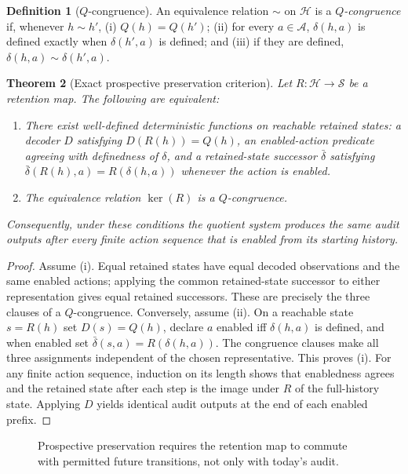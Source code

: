 \documentclass[11pt,letterpaper]{article}
\newtheorem{theorem}{Theorem}[section]
\theoremstyle{definition}
\newtheorem{definition}[theorem]{Definition}
\newcommand{\Hh}{\mathcal H}
\newcommand{\Act}{\mathcal A}
\newcommand{\State}{\mathcal S}
\begin{document}
\begin{definition}[$Q$-congruence]
An equivalence relation $\sim$ on $\Hh$ is a \emph{$Q$-congruence} if, whenever $h\sim h'$, (i) $Q(h)=Q(h')$; (ii) for every $a\in\Act$, $\delta(h,a)$ is defined exactly when $\delta(h',a)$ is defined; and (iii) if they are defined, $\delta(h,a)\sim\delta(h',a)$.
\end{definition}

\begin{theorem}[Exact prospective preservation criterion]\label{thm:dynamic}
Let $R:\Hh\to\State$ be a retention map. The following are equivalent:
\begin{enumerate}[label=(\roman*)]
\item There exist well-defined deterministic functions on reachable retained states: a decoder $D$ satisfying $D(R(h))=Q(h)$, an enabled-action predicate agreeing with definedness of $\delta$, and a retained-state successor $\bar\delta$ satisfying $\bar\delta(R(h),a)=R(\delta(h,a))$ whenever the action is enabled.
\item The equivalence relation $\ker(R)$ is a $Q$-congruence.
\end{enumerate}
Consequently, under these conditions the quotient system produces the same audit outputs after every finite action sequence that is enabled from its starting history.
\end{theorem}
\begin{proof}
Assume (i). Equal retained states have equal decoded observations and the same enabled actions; applying the common retained-state successor to either representation gives equal retained successors. These are precisely the three clauses of a $Q$-congruence. Conversely, assume (ii). On a reachable state $s=R(h)$ set $D(s)=Q(h)$, declare $a$ enabled iff $\delta(h,a)$ is defined, and when enabled set $\bar\delta(s,a)=R(\delta(h,a))$. The congruence clauses make all three assignments independent of the chosen representative. This proves (i). For any finite action sequence, induction on its length shows that enabledness agrees and the retained state after each step is the image under $R$ of the full-history state. Applying $D$ yields identical audit outputs at the end of each enabled prefix.
\end{proof}

\begin{figure}[htbp]\centering
{}
\caption{Prospective preservation requires the retention map to commute with permitted future transitions, not only with today's audit.}
\label{fig:commute}
\end{figure}
\end{document}
